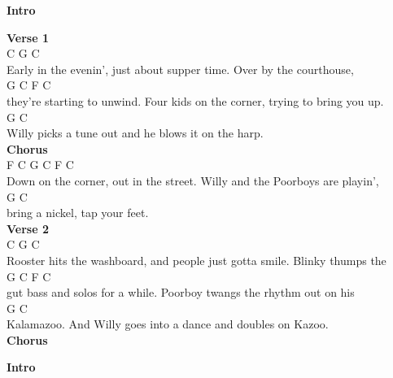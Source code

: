 \documentclass[a4paper]{article}
\begin{document}
    {
        \scriptsize
        \textbf{Intro}
        ~\\
        {
            \cutive
            \obeyspaces

        }
        \textbf{Verse 1}
        ~\\
        {
            \cutive
            \obeyspaces
C                      G                C
\\
Early in the evenin', just about supper time.  Over by the courthouse,
\\
        G              C     F                        C
\\
they're starting to unwind.  Four kids on the corner, trying to bring you up.
\\
                              G               C
\\
Willy picks a tune out and he blows it on the harp.
\\

        }
        \textbf{Chorus}
        ~\\
        {
            \cutive
            \obeyspaces
F           C       G          C                      F            C
\\
Down on the corner, out in the street.  Willy and the Poorboys are playin',
\\
         G               C
\\
bring a nickel, tap your feet.
\\

        }
        \textbf{Verse 2}
        ~\\
        {
            \cutive
            \obeyspaces
C                               G                 C
\\
Rooster hits the washboard, and people just gotta smile.  Blinky thumps the
\\
             G           C       F                             C
\\
gut bass and solos for a while.  Poorboy twangs the rhythm out on his
\\
                                            G             C
\\
Kalamazoo.  And Willy goes into a dance and doubles on Kazoo.
\\

        }
        \textbf{Chorus}
        ~\\
        {
            \cutive
            \obeyspaces

        }
        \textbf{Intro}
        ~\\
        {
            \cutive
            \obeyspaces

}}
\end{document}
